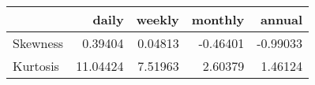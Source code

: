 \begin{tabular}{lrrrr}
\toprule
{} &     daily &   weekly &  monthly &   annual \\
\midrule
Skewness &   0.39404 &  0.04813 & -0.46401 & -0.99033 \\
Kurtosis &  11.04424 &  7.51963 &  2.60379 &  1.46124 \\
\bottomrule
\end{tabular}
